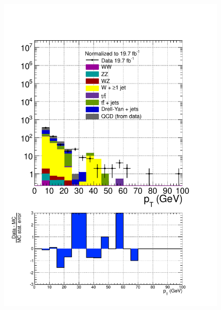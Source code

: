 \begin{figure}[hbtp]
  \begin{center}
    \includegraphics[width=\cmsFigWidth]{figures/dataVsMCQCD_tauMuPT_lowMT_v87}

\end{center}
\end{figure}
